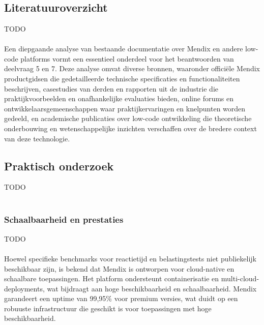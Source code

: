 
\chapter{}%
\label{ch:beter}



\section{Literatuuroverzicht}
TODO
\\
\\
Een diepgaande analyse van bestaande documentatie over Mendix en andere low-code platforms vormt een essentieel onderdeel voor het beantwoorden van deelvraag 5 en 7. Deze analyse omvat diverse bronnen, waaronder officiële Mendix productgidsen die gedetailleerde technische specificaties en functionaliteiten beschrijven, casestudies van derden en rapporten uit de industrie die praktijkvoorbeelden en onafhankelijke evaluaties bieden, online forums en ontwikkelaarsgemeenschappen waar praktijkervaringen en knelpunten worden gedeeld, en academische publicaties over low-code ontwikkeling die theoretische onderbouwing en wetenschappelijke inzichten verschaffen over de bredere context van deze technologie.
\section{Praktisch onderzoek}
TODO
\\
\\
\subsection{Schaalbaarheid en prestaties}
TODO
\\
\\
Hoewel specifieke benchmarks voor reactietijd en belastingstests niet publiekelijk beschikbaar zijn, is bekend dat Mendix is ontworpen voor cloud-native en schaalbare toepassingen. Het platform ondersteunt containerisatie en multi-cloud-deployments, wat bijdraagt aan hoge beschikbaarheid en schaalbaarheid. Mendix garandeert een uptime van 99,95\% voor premium versies, wat duidt op een robuuste infrastructuur die geschikt is voor toepassingen met hoge beschikbaarheid.

